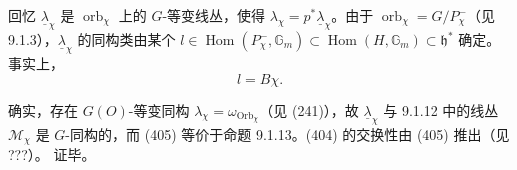 回忆 $\underline{\lambda}_{\chi}$ 是 $\operatorname{orb}_{\chi}$ 上的 $G$-等变线丛，使得 $\lambda_{\chi}=p^{*}\underline{\lambda}_{\chi}$。由于 $\operatorname{orb}_{\chi}=G/P_{\chi}^{-}$（见 9.1.3），$\underline{\lambda}_{\chi}$ 的同构类由某个 $l\in\operatorname{Hom}(P_{\chi}^{-},\mathbb{G}_{m})\subset\operatorname{Hom}(H,\mathbb{G}_{m})\subset\mathfrak{h}^{*}$ 确定。事实上，
\begin{equation}\tag{405}
l=B\chi.
\end{equation}

确实，存在 $G(O)$-等变同构 $\lambda_{\chi}=\omega_{\operatorname{Orb}_{\chi}}$（见 (241)），故 $\underline{\lambda}_{\chi}$ 与 9.1.12 中的线丛 $\mathcal{M}_{\chi}$ 是 $G$-同构的，而 (405) 等价于命题 9.1.13。(404) 的交换性由 (405) 推出（见 ???）。
证毕。
